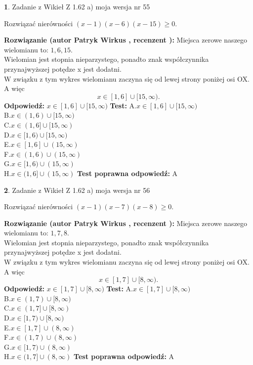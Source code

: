 \documentclass[12pt, a4paper]{article}
\theoremstyle{definition} %
\newtheorem{zad}{}
\newcommand{\zadStart}[1]{\begin{zad}#1\newline}
\newcommand{\zadStop}{\end{zad}}
\newcommand{\rozwStart}[2]{\noindent \textbf{Rozwiązanie (autor #1 , recenzent #2): }\newline}
\newcommand{\rozwStop}{\newline}
\newcommand{\odpStart}{\noindent \textbf{Odpowiedź:}\newline}
\newcommand{\odpStop}{\newline}
\newcommand{\testStart}{\noindent \textbf{Test:}\newline}
\newcommand{\testStop}{\newline}
\newcommand{\kluczStart}{\noindent \textbf{Test poprawna odpowiedź:}\newline}
\newcommand{\kluczStop}{\newline}
\begin{document}
\zadStart{Zadanie z Wikieł Z 1.62 a) moja wersja nr 55}

Rozwiązać nierówności $(x-1)(x-6)(x-15)\ge0$.
\zadStop
\rozwStart{Patryk Wirkus}{}
Miejsca zerowe naszego wielomianu to: $1, 6, 15$.\\
Wielomian jest stopnia nieparzystego, ponadto znak współczynnika przy\linebreak najwyższej potędze x jest dodatni.\\ W związku z tym wykres wielomianu zaczyna się od lewej strony poniżej osi OX. A więc $$x \in [1,6] \cup [15,\infty).$$
\rozwStop
\odpStart
$x \in [1,6] \cup [15,\infty)$
\odpStop
\testStart
A.$x \in [1,6] \cup [15,\infty)$\\
B.$x \in (1,6) \cup [15,\infty)$\\
C.$x \in (1,6] \cup [15,\infty)$\\
D.$x \in [1,6) \cup [15,\infty)$\\
E.$x \in [1,6] \cup (15,\infty)$\\
F.$x \in (1,6) \cup (15,\infty)$\\
G.$x \in [1,6) \cup (15,\infty)$\\
H.$x \in (1,6] \cup (15,\infty)$
\testStop
\kluczStart
A
\kluczStop



\zadStart{Zadanie z Wikieł Z 1.62 a) moja wersja nr 56}

Rozwiązać nierówności $(x-1)(x-7)(x-8)\ge0$.
\zadStop
\rozwStart{Patryk Wirkus}{}
Miejsca zerowe naszego wielomianu to: $1, 7, 8$.\\
Wielomian jest stopnia nieparzystego, ponadto znak współczynnika przy\linebreak najwyższej potędze x jest dodatni.\\ W związku z tym wykres wielomianu zaczyna się od lewej strony poniżej osi OX. A więc $$x \in [1,7] \cup [8,\infty).$$
\rozwStop
\odpStart
$x \in [1,7] \cup [8,\infty)$
\odpStop
\testStart
A.$x \in [1,7] \cup [8,\infty)$\\
B.$x \in (1,7) \cup [8,\infty)$\\
C.$x \in (1,7] \cup [8,\infty)$\\
D.$x \in [1,7) \cup [8,\infty)$\\
E.$x \in [1,7] \cup (8,\infty)$\\
F.$x \in (1,7) \cup (8,\infty)$\\
G.$x \in [1,7) \cup (8,\infty)$\\
H.$x \in (1,7] \cup (8,\infty)$
\testStop
\kluczStart
A
\kluczStop
\end{document}
